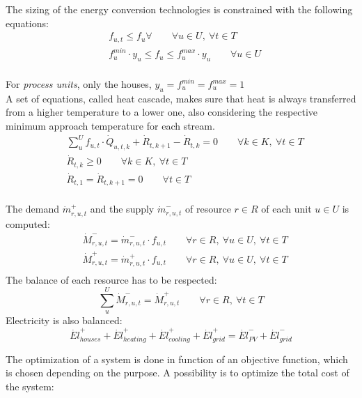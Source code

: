\documentclass{article}
\begin{document}
The sizing of the energy conversion technologies is constrained with the following equations\cite{suciuEnergyIntegrationCO22018a}:
\begin{align}
& f_{u,t} \leq f_{u} \forall \qquad \forall u \in U, \ \forall t \in T  \\
& f_{u}^{min} \cdot y_{u} \leq f_{u} \leq f_{u}^{max} \cdot y_{u} \qquad \forall u \in U\\
\end{align}

For \textit{process units}, only the houses, $y_{u} = f_{u}^{min} = f_{u}^{max} = 1$\\

A set of equations, called heat cascade, makes sure that heat is always transferred from a higher temperature to a lower one, also considering the respective minimum approach temperature for each stream.
\begin{align}
& \sum_{u}^{U} f_{u,t}  \cdot \dot{Q}_{u,t,k} + \dot{R}_{t,k+1} - \dot{R}_{t,k} = 0 \qquad \forall k \in K, \ \forall t \in T \\
& \dot{R}_{t,k} \geq 0 \qquad \forall k \in K, \ \forall t \in T  \\
& \dot{R}_{t,1} = \dot{R}_{t,k+1} = 0 \qquad \forall t \in T  \\
\end{align}

The demand $\dot{m}_{r,u,t}^{+}$ and the supply $\dot{m}_{r,u,t}^{-}$ of resource $r \in R$ of each unit $u \in U$ is computed:
\begin{align}
& \dot{M}_{r,u,t}^{-} = \dot{m}_{r,u,t}^{-} \cdot f_{u,t} \qquad \forall r \in R, \ \forall u \in U, \ \forall t \in T \\
& \dot{M}_{r,u,t}^{+} = \dot{m}_{r,u,t}^{+} \cdot f_{u,t} \qquad \forall r \in R, \ \forall u \in U, \ \forall t \in T  \\
\end{align}
The balance of each resource has to be respected:
\begin{equation}
\sum_{u}^{U} \dot{M}_{r,u,t}^{-} = \dot{M}_{r,u,t}^{+} \qquad \forall r \in R, \ \forall t \in T
\end{equation}
Electricity is also balanced:
\begin{equation}
\dot{El}_{houses}^{+} + \dot{El}_{heating}^{+} + \dot{El}_{cooling}^{+} + \dot{El}_{grid}^{+} = \dot{El}_{PV}^{-} + \dot{El}_{grid}^{-}
\end{equation}

The optimization of a system is done in function of an objective function, which is chosen depending on the purpose. A possibility is to optimize the total cost of the system:
\end{document}
